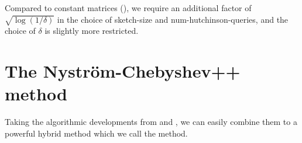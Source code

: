 Compared to constant matrices (),
we require an additional factor of $\sqrt{\log(1/\delta)}$ in the choice of
\gls{sketch-size} and \gls{num-hutchinson-queries}, and the choice of $\delta$
is slightly more restricted.


\section{The Nystr\"om-Chebyshev++ method}
\label{sec:4-nystromchebyshev-nystromchebyshev-pp}

Taking the algorithmic developments from  and ,
we can easily combine them to a powerful hybrid method which we call the 
method.

